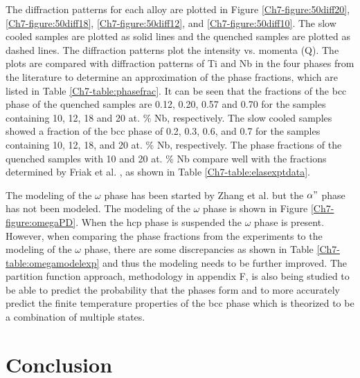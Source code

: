 The diffraction patterns for each alloy are plotted in Figure \ref{Ch7-figure:50diff20}, \ref{Ch7-figure:50diff18}, \ref{Ch7-figure:50diff12}, and \ref{Ch7-figure:50diff10}. The slow cooled samples are plotted as solid lines and the quenched samples are plotted as dashed lines. The diffraction patterns plot the intensity vs. momenta (Q). The plots are compared with diffraction patterns of Ti and Nb in the four phases from the literature to determine an approximation of the phase fractions, which are listed in Table \ref{Ch7-table:phasefrac}. It can be seen that the fractions of the bcc phase of the quenched samples are 0.12, 0.20, 0.57 and 0.70 for the samples containing 10, 12, 18 and 20 at. \% Nb, respectively. The slow cooled samples showed a fraction of the bcc phase of 0.2, 0.3, 0.6, and 0.7 for the samples containing 10, 12, 18, and 20 at. \% Nb, respectively. The phase fractions of the quenched samples with 10 and 20 at. \% Nb compare well with the fractions determined by Friak et al. \cite{Friak2012}, as shown in Table \ref{Ch7-table:elasexptdata}. 

The modeling of the $\omega$ phase has been started by Zhang et al. \cite{Zhang2001} but the $\alpha"$ phase has not been modeled. The modeling of the $\omega$ phase is shown in Figure \ref{Ch7-figure:omegaPD}. When the hcp phase is suspended the $\omega$ phase is present. However, when comparing the phase fractions from the experiments to the modeling of the $\omega$ phase, there are some discrepancies as shown in Table \ref{Ch7-table:omegamodelexp} and thus the modeling needs to be further improved. The partition function approach, methodology in appendix F, is also being studied to be able to predict the probability that the phases form and to more accurately predict the finite temperature properties of the bcc phase which is theorized to be a combination of multiple states.

\section{Conclusion}

